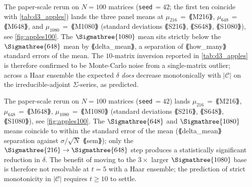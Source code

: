%
%


The paper-scale rerun on $N=100$ matrices (\texttt{seed}\,$=42$; the first
ten coincide with \cref{tab:d3_apples}) lands the three panel means at
$\mu_{216} \,=\, $⟪M216⟫, $\mu_{648} \,=\, $⟪M648⟫, and
$\mu_{1080} \,=\, $⟪M1080⟫ (standard deviations
⟪S216⟫, ⟪S648⟫, ⟪S1080⟫), see \cref{fig:apples100}. The
$\Sigmathree{1080}$ mean sits strictly below the $\Sigmathree{648}$ mean by
⟪delta_mean⟫, a separation of ⟪how_many⟫ standard errors of the mean. The
$10$-matrix inversion reported in \cref{tab:d3_apples} is therefore confirmed
to be Monte-Carlo noise from a single-matrix outlier; across a Haar ensemble
the expected $\delta$ \emph{does} decrease monotonically with $|\mathcal{C}|$
on the irreducible-adjoint $\Sigma$-series, as predicted.


The paper-scale rerun on $N=100$ matrices (\texttt{seed}\,$=42$) lands
$\mu_{216} \,=\, $⟪M216⟫, $\mu_{648} \,=\, $⟪M648⟫,
$\mu_{1080} \,=\, $⟪M1080⟫ (standard deviations
⟪S216⟫, ⟪S648⟫, ⟪S1080⟫), see \cref{fig:apples100}. The $\Sigmathree{648}$
and $\Sigmathree{1080}$ means coincide to within the standard error of the
mean (⟪delta_mean⟫ separation against $\sigma/\sqrt{N}$ ⟪sem⟫); only the
$\Sigmathree{216}\to\Sigmathree{648}$ step produces a statistically
significant reduction in $\delta$. The benefit of moving to the $3\!\times$
larger $\Sigmathree{1080}$ base is therefore not resolvable at $t=5$ with a
Haar ensemble; the prediction of strict monotonicity in $|\mathcal{C}|$
requires $t\geq 10$ to settle.

